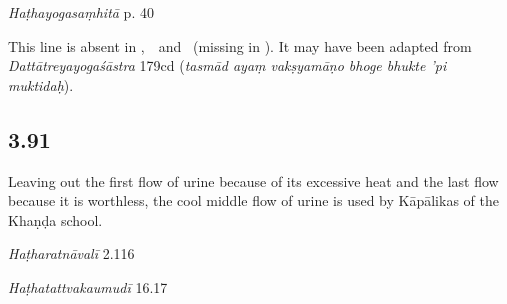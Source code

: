 \begin{ekdosis}

\begin{testimonia}[hp03_090_1]
\emph{Haṭhayogasaṃhitā} p. 40
\begin{versinnote}
\end{versinnote}
\end{testimonia}

\begin{philcomm}[hp03_090_1]
This line is absent in \alphaTwo,\ \alphaThree\ and \gammaOne\ (missing in \alphaOne). It may have been adapted from \emph{Dattātreyayogaśāstra} 179cd (\emph{tasmād ayaṃ vakṣyamāṇo bhoge bhukte ’pi muktidaḥ}). 
\end{philcomm}


\subsection*{3.91}
\begin{translation}[hp03_091]
Leaving out the first flow of urine because of its excessive heat and the last flow because it is worthless, the cool middle flow of urine is used by Kāpālikas of the Khaṇḍa school.
\end{translation}

\begin{sources}[hp03_091]
\end{sources}

\begin{testimonia}[hp03_091]
\emph{Haṭharatnāvalī} 2.116
\begin{versinnote}
\tl{\var{vihāya nityāṃ ] pittolbaṇatvāt \vl}\\+}
\tl{\var{anarghyām ] anarghyā}\\!}
\end{versinnote}

\emph{Haṭhatattvakaumudī} 16.17
\begin{versinnote}
\end{versinnote}


\end{testimonia}
\end{ekdosis}
